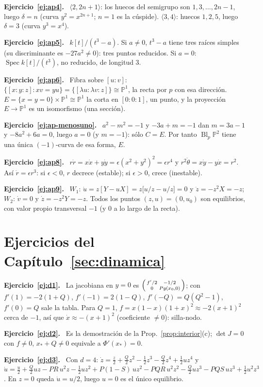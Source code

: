\documentclass[11pt,a4paper,oneside]{book}
\newcommand{\Spec}{\operatorname{Spec}}
\newcommand{\Bl}{\operatorname{Bl}}
\newcommand{\PP}{\mathbb{P}}
\theoremstyle{plain}
\theoremstyle{definition}
\theoremstyle{remark}
\newcommand{\sol}[1]{\par\medskip\noindent\textbf{Ejercicio~\ref{#1}.}\ }
\begin{document}
\sol{ej:ap4} $\langle2,2n+1\rangle$: los huecos del semigrupo son $1,3,\dots,2n-1$, luego $\delta=n$ (curva $y^2=x^{2n+1}$; $n=1$ es la cúspide). $\langle3,4\rangle$: huecos $1,2,5$, luego $\delta=3$ (curva $y^3=x^4$).

\sol{ej:ap5} $k[t]/(t^3-a)$. Si $a\ne0$, $t^3-a$ tiene tres raíces simples (su discriminante es $-27a^2\ne0$): tres puntos reducidos. Si $a=0$: $\Spec k[t]/(t^3)$, no reducido, de longitud $3$.

\sol{ej:ap6} Fibra sobre $[u:v]$: $\{[x:y:z]: xv=yu\}=\{[\lambda u:\lambda v:z]\}\cong\PP^1$, la recta por $p$ con esa dirección. $E=\{x=y=0\}\times\PP^1\cong\PP^1$ la corta en $[0:0:1]$, un punto, y la proyección $E\to\PP^1$ es un isomorfismo (una sección).

\sol{ej:ap-menosuno} $a^2-m^2=-1$ y $-3a+m=-1$ dan $m=3a-1$ y $-8a^2+6a=0$, luego $a=0$ (y $m=-1$): sólo $C=E$. Por tanto $\Bl_p\PP^2$ tiene una única $(-1)$-curva de esa forma, $E$.

\sol{ej:ap8} $r\dot r=x\dot x+y\dot y=\epsilon(x^2+y^2)^2=\epsilon r^4$ y $r^2\dot\theta=x\dot y-y\dot x=r^2$. Así $\dot r=\epsilon r^3$: si $\epsilon<0$, $r$ decrece (estable); si $\epsilon>0$, crece (inestable).

\sol{ej:ap9} $W_1$: $\dot u=z[Y-uX]=z\big[u/z-u/z\big]=0$ y $\dot z=-z^2X=-z$; $W_2$: $\dot v=0$ y $\dot z=-z^2Y=-z$. Todos los puntos $(z,u)=(0,u_0)$ son equilibrios, con valor propio transversal $-1$ (y $0$ a lo largo de la recta).

\section*{Ejercicios del Capítulo~\ref{sec:dinamica}}
\sol{ej:d1} La jacobiana en $y=0$ es $\begin{psmallmatrix}f'/2&-1/2\\0&Pg(x_0,0)\end{psmallmatrix}$; con $f'(1)=-2(1+Q)$, $f'(-1)=2(1-Q)$, $f'(-Q)=Q(Q^2-1)$, $f'(0)=Q$ sale la tabla. Para $Q=1$, $f=x(1-x)(1+x)^2\approx-2(x+1)^2$ cerca de $-1$, así que $\dot x\approx-(x+1)^2$ (coeficiente $\ne0$): silla-nodo.

\sol{ej:d2} Es la demostración de la Prop.~\ref{prop:interior}(c); $\det J=0$ con $f\ne0$, $x_*+Q\ne0$ equivale a $\Phi'(x_*)=0$.

\sol{ej:d3} Con $d=4$: $\dot z=\tfrac z2+\tfrac Q2z^2-\tfrac12z^3-\tfrac Q2z^4+\tfrac12uz^4$ y $\dot u=\tfrac u2+\tfrac Q2uz-PR\,u^2z-\tfrac12uz^2+P(1-S)\,uz^2-PQR\,u^2z^2-\tfrac Q2uz^3-PQS\,uz^3+\tfrac12u^2z^3$. En $z=0$ queda $\dot u=u/2$, luego $u=0$ es el único equilibrio.
\end{document}
